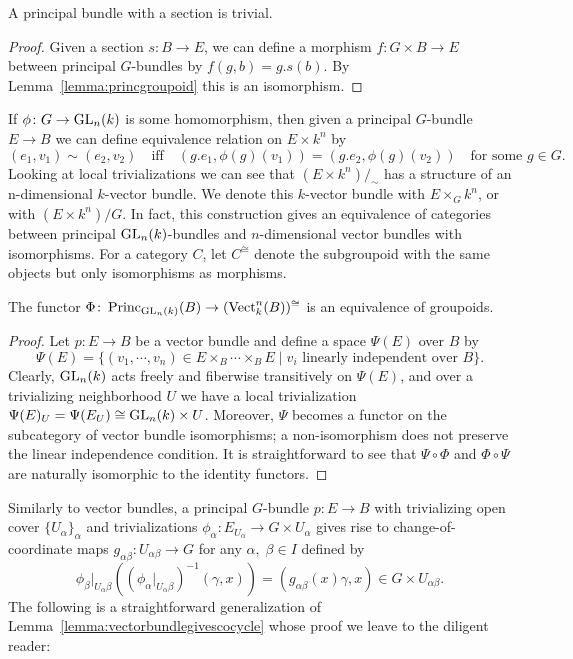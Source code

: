 \documentclass[a4paper,openany]{scrbook}
\DeclareMathOperator{\Vect}{Vect}
\DeclareMathOperator{\Princ}{Princ}
\begin{document}
\begin{corollary}
A principal bundle with a section is trivial.
\end{corollary}
\begin{proof}
  Given a section $s\colon B \to E$, we can define a morphism $f\colon G \times B \rightarrow E$ between principal $G$-bundles by $f(g,b) = g.s(b)$. By Lemma~\ref{lemma:princgroupoid} this is an isomorphism.
\end{proof}

If $\phi\colon G \to \operatorname{GL}_n(k)$ is some homomorphism, then given a principal $G$-bundle $E \to B$ we can define equivalence relation on $E \times k^n$ by
\[
  (e_1,v_1) \sim (e_2,v_2) \quad \text{iff} \quad (g.e_1, \phi(g)(v_1)) = (g.e_2,\phi(g)(v_2)) \quad \text{for some }g \in G.
\] 
Looking at local trivializations we can see that $(E\times k^n)/_{\sim}$ has a structure of an n-dimensional $k$-vector bundle. We denote this $k$-vector bundle with $E \times_G k^n$, or with $(E \times k^n)/G$. In fact, this construction gives an equivalence of categories between principal $\operatorname{GL}_n(k)$-bundles and $n$-dimensional vector bundles with isomorphisms. For a category $C$, let $C^{\cong}$ denote the subgroupoid with the same objects but only isomorphisms as morphisms. 

\begin{prop}
The functor $\Phi\colon \Princ_{\GL_n(k)}(B) \to (\Vect^n_k(B))^{\cong}$ is an equivalence of groupoids.
\end{prop}
\begin{proof}
Let $p\colon E \to B$ be a vector bundle and define a space $\Psi(E)$ over $B$ by
\[
\Psi(E) = \{(v_1,\cdots,v_n) \in E \times_B \cdots \times_B E \mid v_i \text{ linearly independent over $B$}\}.
\]
Clearly, $\operatorname{GL}_n(k)$ acts freely and fiberwise transitively on $\Psi(E)$, and over a trivializing neighborhood $U$ we have a local trivialization $\Psi(E)_U = \Psi(E_U) \cong \operatorname{GL}_n(k) \times U$. Moreover, $\Psi$ becomes a functor on the subcategory of vector bundle isomorphisms; a non-isomorphism does not preserve the linear independence condition. It is straightforward to see that $\Psi\circ\Phi$ and $\Phi\circ\Psi$ are naturally isomorphic to the identity functors.
\end{proof}

Similarly to vector bundles, a principal $G$-bundle $p\colon E \to B$ with trivializing open cover $\{U_\alpha\}_{\alpha}$ and trivializations $\phi_\alpha\colon E_{U_{\alpha}} \to G \times U_{\alpha}$ gives rise to change-of-coordinate maps $g_{\alpha\beta}\colon U_{\alpha\beta} \to G$ for any $\alpha,\;\beta \in I$ defined by
\[
\phi_\beta|_{U_\alpha\beta}\left((\phi_\alpha|_{U_\alpha\beta})^{-1}(\gamma,x)\right) = (g_{\alpha\beta}(x)\gamma,x) \in G \times U_{\alpha\beta}.
\]
The following is a straightforward generalization of Lemma~\ref{lemma:vectorbundlegivescocycle} whose proof we leave to the diligent reader:
\end{document}

